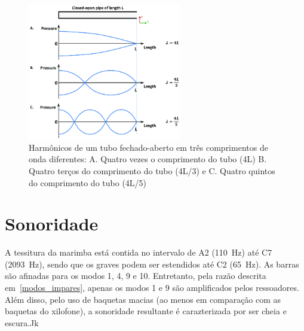 \documentclass{article}
\begin{document}
\begin{figure}[H]
	\centering
	\includegraphics[width=0.6\textwidth]{Harmonics-of-a-closed-open-pipe-in-three-different-wavelengths-A-Four-times-the-length.png}
	\caption{Harmônicos de um tubo fechado-aberto em três comprimentos de onda diferentes: A. Quatro vezes o comprimento do tubo (4L) B. Quatro terços do comprimento do tubo (4L/3) e C. Quatro quintos do comprimento do tubo (4L/5)~\cite{closed_open_pipe}}
	\label{fig:closed_open_pipe}
\end{figure}

\section{Sonoridade}

A tessitura da marimba está contida no intervalo de A2 (\SI{110}{\hertz}) até C7 (\SI{2093}{\hertz}), sendo que os graves podem ser estendidos até C2 (\SI{65}{\hertz}).
As barras são afinadas para os modos 1, 4, 9 e 10. Entretanto, pela razão descrita em~\ref{modos_impares}, apenas os modos 1 e 9 são amplificados pelos ressoadores. Além disso, pelo uso de baquetas macias (ao menos em comparação com as baquetas do xilofone), a sonoridade resultante é carazterizada por ser cheia e escura.Jk



\end{document}
